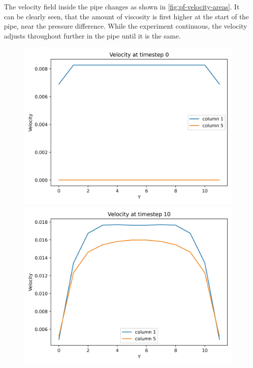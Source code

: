 The velocity field inside the pipe changes as shown in \cref{fig:pf-velocity-areas}.
It can be clearly seen, that the amount of viscosity is first higher at the start of the pipe, near the pressure difference.
While the experiment continuous, the velocity adjusts throughout further in the pipe until it is the same.


\begin{figure}[h!]
    \begin{minipage}{0.33\textwidth}
        \includegraphics[width=\linewidth]{graphs/PoiseuilleFlow/velocity_at_columns_for_step_0}
    \end{minipage}%
    \begin{minipage}{0.33\textwidth}
        \includegraphics[width=\linewidth]{graphs/PoiseuilleFlow/velocity_at_columns_for_step_10}

\end{minipage}
\end{figure}
